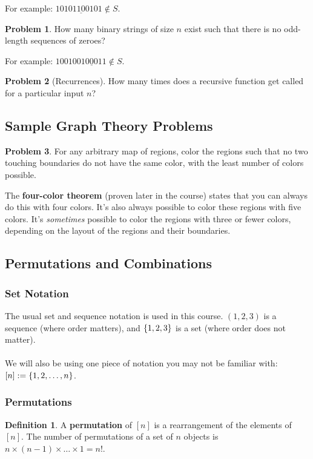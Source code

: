 \documentclass[]{article}
\theoremstyle{definition}
\newtheorem{problem}{Problem}[section]
\newtheorem*{defn}{Definition}
\DeclarePairedDelimiter{\set}{\lbrace}{\rbrace}
\begin{document}
			For example: $1010\underline{1100}101 \not \in S$.
		
			\begin{problem}
				How many binary strings of size $n$ exist such that there is no odd-length sequences of zeroes? 
			\end{problem}
		
			For example: $1001001\underline{000}11 \not \in S$.
		
			\begin{problem}[Recurrences]
				How many times does a recursive function get called for a particular input $n$?
			\end{problem}
		
		\subsection{Sample Graph Theory Problems}
			\begin{problem}
				For any arbitrary map of regions, color the regions such that no two touching boundaries do not have the same color, with the least number of colors possible.
			\end{problem}
		
			The \textbf{four-color theorem} (proven later in the course) states that you can always do this with four colors. It's also always possible to color these regions with five colors. It's \emph{sometimes} possible to color the regions with three or fewer colors, depending on the layout of the regions and their boundaries.
		
		\subsection{Permutations and Combinations}
			\subsubsection{Set Notation}
				The usual set and sequence notation is used in this course. $(1, 2, 3)$ is a sequence (where order matters), and $\set{1, 2, 3}$ is a set (where order does not matter).
				\\ \\
				We will also be using one piece of notation you may not be familiar with: $[n] := \set{1, 2, \ldots, n}$.

			\subsubsection{Permutations}
				\begin{defn}
					A \textbf{permutation} of $[n]$ is a rearrangement of the elements of $[n]$. The number of permutations of a set of $n$ objects is $n \times (n - 1) \times \ldots \times 1 = n!$. 
				\end{defn}
			
\end{document}
